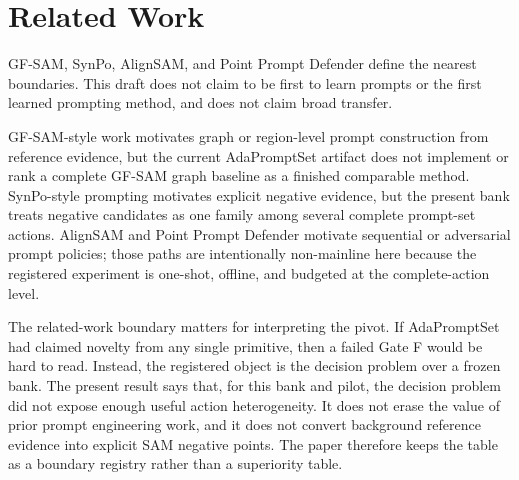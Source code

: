 \section{Related Work}
GF-SAM, SynPo, AlignSAM, and Point Prompt Defender define the nearest boundaries. This draft does not claim to be first to learn prompts or the first learned prompting method, and does not claim broad transfer.

GF-SAM-style work motivates graph or region-level prompt construction from reference evidence, but the current AdaPromptSet artifact does not implement or rank a complete GF-SAM graph baseline as a finished comparable method. SynPo-style prompting motivates explicit negative evidence, but the present bank treats negative candidates as one family among several complete prompt-set actions. AlignSAM and Point Prompt Defender motivate sequential or adversarial prompt policies; those paths are intentionally non-mainline here because the registered experiment is one-shot, offline, and budgeted at the complete-action level.

The related-work boundary matters for interpreting the pivot. If AdaPromptSet had claimed novelty from any single primitive, then a failed Gate F would be hard to read. Instead, the registered object is the decision problem over a frozen bank. The present result says that, for this bank and pilot, the decision problem did not expose enough useful action heterogeneity. It does not erase the value of prior prompt engineering work, and it does not convert background reference evidence into explicit SAM negative points. The paper therefore keeps the table as a boundary registry rather than a superiority table.
